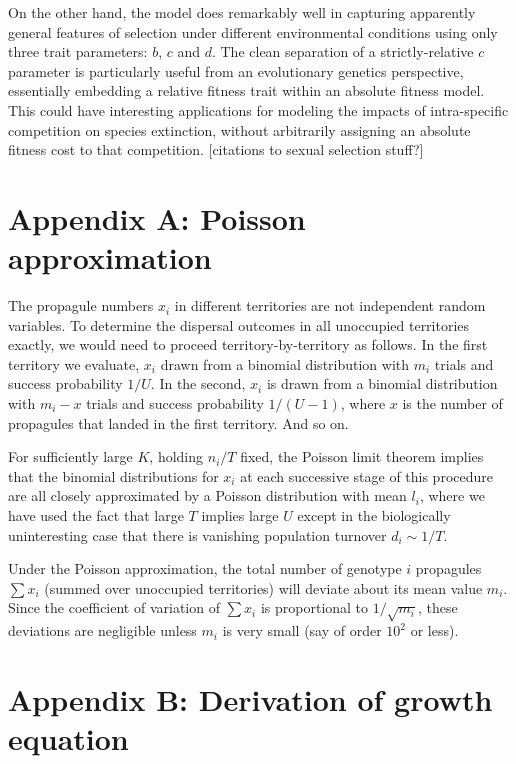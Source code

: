 \documentclass[11pt]{article}
\begin{document}
On the other hand, the model does remarkably well in capturing apparently general features of selection under different environmental conditions using only three trait parameters: $b$, $c$ and $d$. The clean separation of a strictly-relative $c$ parameter is particularly useful from an evolutionary genetics perspective, essentially embedding a relative fitness trait within an absolute fitness model. This could have interesting applications for modeling the impacts of intra-specific competition on species extinction, without arbitrarily assigning an absolute fitness cost to that competition. [citations to sexual selection stuff?]


 

\section*{Appendix A: Poisson approximation}

The propagule numbers $x_i$ in different territories are not independent random variables. To determine the dispersal outcomes in all unoccupied territories exactly, we would need to proceed territory-by-territory as follows. In the first territory we evaluate, $x_i$ drawn from a binomial distribution with $m_i$ trials and success probability $1/U$. In the second, $x_i$ is drawn from a binomial distribution with $m_i-x$ trials and success probability $1/(U-1)$, where $x$ is the number of propagules that landed in the first territory. And so on.

For sufficiently large $K$, holding $n_i/T$ fixed, the Poisson limit theorem implies that the binomial distributions for $x_i$ at each successive stage of this procedure are all closely approximated by a Poisson distribution with mean $l_i$, where we have used the fact that large $T$ implies large $U$ except in the biologically uninteresting case that there is vanishing population turnover $d_i \sim 1/T$. 

Under the Poisson approximation, the total number of genotype $i$ propagules $\sum x_i$ (summed over unoccupied territories) will deviate about its mean value $m_i$. Since the coefficient of variation of $\sum x_i$ is proportional to $1/\sqrt{m_i}$, these deviations are negligible unless $m_i$ is very small (say of order $10^2$ or less).

\section*{Appendix B: Derivation of growth equation}
\end{document}
